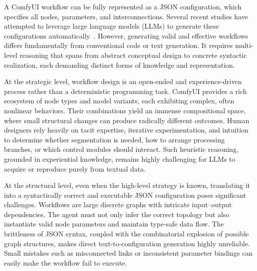 \documentclass[runningheads]{llncs}
\begin{document}
A ComfyUI workflow can be fully represented as a JSON configuration, which specifies all nodes, parameters, and interconnections.
%
Several recent studies have attempted to leverage large language models (LLMs) to generate these configurations automatically~\cite{xue2025comfybench,gal2024comfygen,xu2025comfyuir1,guo2025comfymind,huang2025comfygpt,sobania2024comfygi}.
%
However, generating valid and effective workflows differs fundamentally from conventional code or text generation.
%
It requires multi-level reasoning that spans from abstract conceptual design to concrete syntactic realization, each demanding distinct forms of knowledge and representation.


At the strategic level, workflow design is an open-ended and experience-driven process rather than a deterministic programming task.
%
ComfyUI provides a rich ecosystem of node types and model variants, each exhibiting complex, often nonlinear behaviors.
%
Their combinations yield an immense compositional space, where small structural changes can produce radically different outcomes.
%
Human designers rely heavily on tacit expertise, iterative experimentation, and intuition to determine whether segmentation is needed, how to arrange processing branches, or which control modules should interact.
%
Such heuristic reasoning, grounded in experiential knowledge, remains highly challenging for LLMs to acquire or reproduce purely from textual data.


At the structural level, even when the high-level strategy is known, translating it into a syntactically correct and executable JSON configuration poses significant challenges.
%
Workflows are large discrete graphs with intricate input–output dependencies.
%
The agent must not only infer the correct topology but also instantiate valid node parameters and maintain type-safe data flow.
%
The brittleness of JSON syntax, coupled with the combinatorial explosion of possible graph structures, makes direct text-to-configuration generation highly unreliable.
%
Small mistakes such as misconnected links or inconsistent parameter bindings can easily make the workflow fail to execute.


\end{document}
